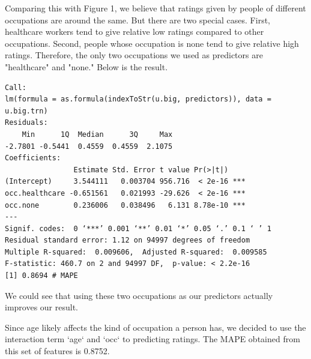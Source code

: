 \documentclass[11pt]{article}
\begin{document}
Comparing this with Figure 1, we believe that ratings given by 
people of different occupations are around the same. But there are
two special cases. First, healthcare workers tend to give relative
low ratings compared to other occupations. Second, people whose 
occupation is none tend to give relative high ratings. Therefore,
the only two occupations we used as predictors are "healthcare" and
"none." Below is the result.
\begin{verbatim}
Call:
lm(formula = as.formula(indexToStr(u.big, predictors)), data = u.big.trn)
Residuals:
    Min      1Q  Median      3Q     Max 
-2.7801 -0.5441  0.4559  0.4559  2.1075 
Coefficients:
                Estimate Std. Error t value Pr(>|t|)    
(Intercept)     3.544111   0.003704 956.716  < 2e-16 ***
occ.healthcare -0.651561   0.021993 -29.626  < 2e-16 ***
occ.none        0.236006   0.038496   6.131 8.78e-10 ***
---
Signif. codes:  0 ‘***’ 0.001 ‘**’ 0.01 ‘*’ 0.05 ‘.’ 0.1 ‘ ’ 1
Residual standard error: 1.12 on 94997 degrees of freedom
Multiple R-squared:  0.009606,	Adjusted R-squared:  0.009585 
F-statistic: 460.7 on 2 and 94997 DF,  p-value: < 2.2e-16
[1] 0.8694 # MAPE
\end{verbatim}
We could see that using these two occupations as our predictors 
actually improves our result.
 
Since age likely affects
the kind of occupation a person has, we decided to use the interaction term `age` and `occ` to predicting
ratings. The MAPE obtained from this set of features is 0.8752.
\end{document}
